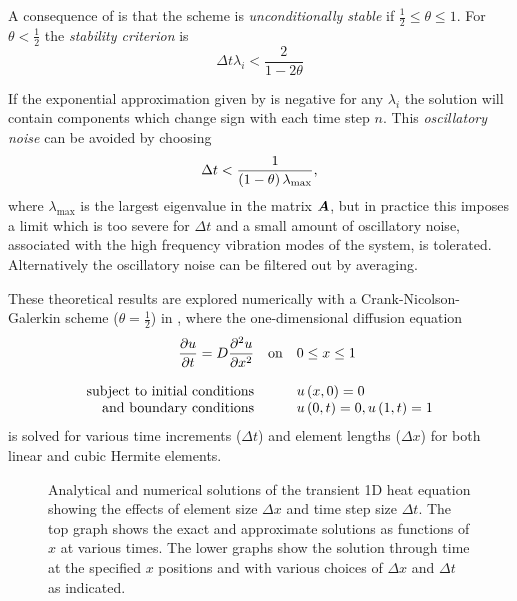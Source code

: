 A consequence of  is that the scheme is \emph{unconditionally
  stable} if $\frac{1}{2} \leq \theta \leq 1$. For $\theta < \frac{1}{2}$ the
\emph{stability criterion} is
\begin{equation}
  \Delta t \lambda_{i}< \dfrac{2}{1-2\theta}
  \label{eqn:scrit}
\end{equation}
   
If the exponential approximation given by  is negative for
any $\lambda_{i}$ the solution will contain components which change sign with
each time step $n$. This \emph{oscillatory noise} can be avoided by choosing
\begin{equation}
  \Delta t < \dfrac{1}{\left( 1-\theta \right)\lambda_{\text{max}}},
  \label{eqn:oscnoise}
\end{equation}
where $\lambda_{\text{max}}$ is the largest eigenvalue in the matrix $\matr{A}$,
but in practice this imposes a limit which is too severe for $\Delta t$ and a small
amount of oscillatory noise, associated with the high frequency vibration modes
of the system, is tolerated.  Alternatively the oscillatory noise can be
filtered out by averaging.

These theoretical results are explored numerically with a
Crank-Nicolson-Galerkin scheme ($\theta= \frac{1}{2}$) in ,
where the one-dimensional diffusion equation
\begin{equation}
  \begin{array}{rcl}
     \dfrac{\partial u}{\partial t} = D   \dfrac{\partial^{2} u}{\partial {x}^{2}}    & \text{on} &0 \leq x \leq 1 \\\\
    \mbox{subject to initial conditions} &&  u\left( x,0 \right)  = 0 \\
    \mbox{and boundary conditions} &&  u\left( 0,t \right)  = 0 ,  u\left( 1,t \right)  = 1 
  \end{array}
  \label{1DDE}
\end{equation}
is solved for various time increments ($\Delta t$) and element lengths
($\Delta x$) for both linear and cubic Hermite elements.
\begin{figure} \centering
 
 \caption{Analytical and numerical solutions of the
   transient 1D heat equation showing the effects of element size $\Delta x$
   and time step size $\Delta t$. The top graph shows the exact and
   approximate solutions as functions of $x$ at various times. The lower
   graphs show the solution through time at the specified $x$ positions and
   with various choices of $\Delta x$ and $\Delta t$ as indicated.}
 \label{fig:annumsol}
\end{figure}

